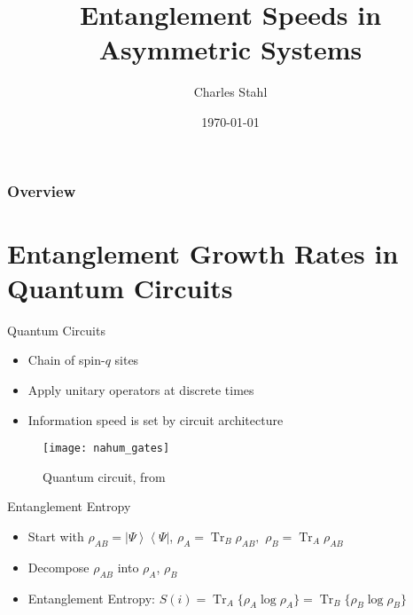 \documentclass{beamer}
\title[Short title]{Entanglement Speeds in Asymmetric Systems} %
\author{Charles Stahl} %
\date{\today} %
\newcommand{\ket}[1]{\left|#1\right\rangle}
\newcommand{\bra}[1]{\left\langle#1\right|}
\DeclareMathOperator{\Tr}{Tr}
\begin{document}
\begin{frame}
\titlepage %
\end{frame}

\begin{frame}
\frametitle{Overview} %
\tableofcontents %
\end{frame}


\section{Entanglement Growth Rates in Quantum Circuits}

\begin{frame}{Quantum Circuits}
\begin{itemize}
	\item Chain of spin-$q$ sites
	\item Apply unitary operators at discrete times
	\item Information speed is set by circuit architecture
\end{itemize}
\begin{figure}
	\centering
	\texttt{[image: nahum\_gates]}
	\caption{Quantum circuit, from \cite{Nahum2017}}
\end{figure}
\end{frame}

\begin{frame}{Entanglement Entropy}
\begin{itemize}
	\item Start with $\rho_{AB}= \ket{\Psi}\bra{\Psi}$, $\rho_A = \Tr_B\rho_{AB},$ $\rho_B = \Tr_A\rho_{AB}$
	\item Decompose $\rho_{AB}$ into $\rho_A$, $\rho_B$
	\item Entanglement Entropy: $S(i) = \Tr_A\{\rho_A\log\rho_A\} =
		\Tr_B\{\rho_B\log\rho_B\}$
\end{itemize}
\end{frame}
\end{document}
